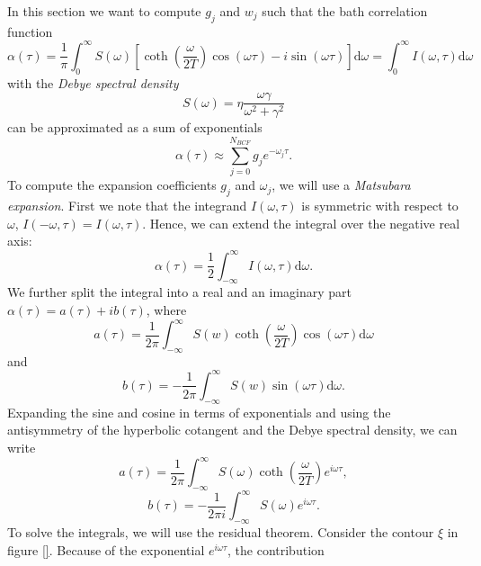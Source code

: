 In this section we want to compute $g_j$ and $w_j$ such that the bath correlation function
\begin{equation*}
    \alpha(\tau) = \frac{1}{\pi} \int_0^\infty S(\omega)
    \left[
        \coth\left(\frac{\omega}{2T}\right)\cos(\omega\tau)-i\sin(\omega\tau)
    \right]\text{d}\omega
    = \int_0^\infty I(\omega,\tau)\text{d}\omega
\end{equation*}
with the \textit{Debye spectral density}
\begin{equation*}
    S(\omega) = \eta \frac{\omega\gamma}{\omega^2+\gamma^2}
\end{equation*}
can be approximated as a sum of exponentials
\begin{equation*}
    \alpha(\tau) \approx \sum_{j=0}^{N_{BCF}}g_je^{-\omega_j\tau}.
\end{equation*}
To compute the expansion coefficients $g_j$ and $\omega_j$, we will use a \textit{Matsubara expansion}.
First we note that the integrand $I(\omega, \tau)$ is symmetric with respect to $\omega$,
$I(-\omega, \tau) = I(\omega, \tau)$. Hence, we can extend the integral over the negative real axis:
\begin{equation*}
    \alpha(\tau) = \frac{1}{2} \int_{-\infty}^\infty I(\omega,\tau)\text{d}\omega.
\end{equation*}
We further split the integral into a real and an imaginary part $\alpha(\tau) = a(\tau) + i b(\tau)$, where
\begin{equation*}
    a(\tau) = \frac{1}{2\pi}\int_{-\infty}^\infty S(w)\coth\left(
        \frac{\omega}{2T}
    \right) \cos(\omega\tau) \text{d}\omega
\end{equation*}
and
\begin{equation*}
    b(\tau) = -\frac{1}{2\pi}\int_{-\infty}^\infty S(w)\sin(\omega\tau)\text{d}\omega.
\end{equation*}
Expanding the sine and cosine in terms of exponentials and using the antisymmetry of the
hyperbolic cotangent and the Debye spectral density, we can write
\begin{equation*}
    a(\tau) = \frac{1}{2\pi}\int_{-\infty}^\infty S(\omega)\coth\left(
        \frac{\omega}{2T}
    \right)e^{i\omega\tau},
\end{equation*}
\begin{equation*}
    b(\tau) = -\frac{1}{2\pi i}\int_{-\infty}^\infty S(\omega)e^{i\omega\tau}.
\end{equation*}
To solve the integrals, we will use the residual theorem. Consider the contour
$\xi$ in figure \ref{}. Because of the exponential $e^{i\omega\tau}$, the contribution
